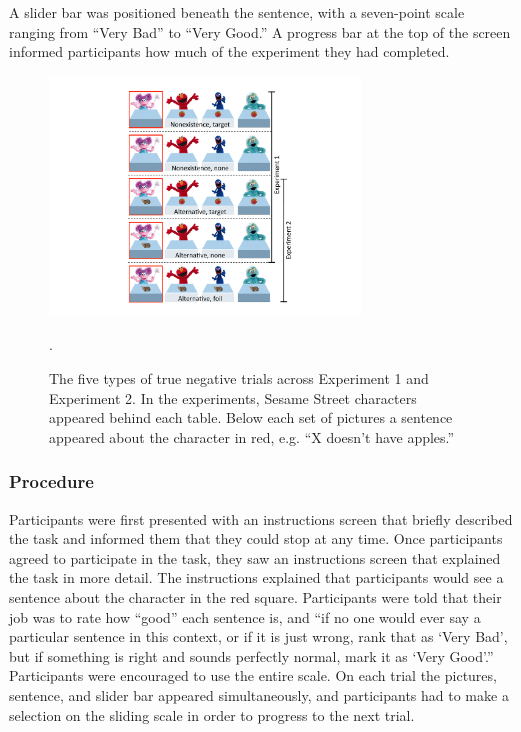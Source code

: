 \documentclass[10pt,letterpaper]{article}
\begin{document}
A slider bar was positioned beneath the sentence, with a seven-point scale ranging from ``Very Bad'' to ``Very Good.''  A progress bar at the top of the screen informed participants how much of the experiment they had completed. 

\begin{figure}[t]
\begin{center} 
\includegraphics[width=3.25in]{figures/trialtypes.pdf}
\caption{\label{fig:trial} The five types of true negative trials across Experiment 1 and Experiment 2.  In the experiments, Sesame Street characters appeared behind each table.  Below each set of pictures a sentence appeared about the character in red, e.g. ``X doesn't have apples.''}.  
\end{center} 
\end{figure}

\subsubsection{Procedure}

Participants were first presented with an instructions screen that briefly described the task and informed them that they could stop at any time.  Once participants agreed to participate in the task, they saw an instructions screen that explained the task in more detail.  The instructions explained that participants would see a sentence about the character in the red square.  Participants were told that their job was to rate how ``good'' each sentence is, and ``if no one would ever say a particular sentence in this context, or if it is just wrong, rank that as `Very Bad', but if something is right and sounds perfectly normal, mark it as `Very Good'.''  Participants were encouraged to use the entire scale. On each trial the pictures, sentence, and slider bar appeared simultaneously, and participants had to make a selection on the sliding scale in order to progress to the next trial.  
\end{document}
